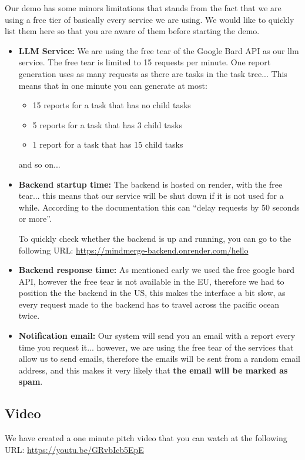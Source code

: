 \documentclass{article}
\begin{document}
Our demo has some minors limitations that stands from the fact that we are using a free tier of basically every service we are using.
We would like to quickly list them here so that you are aware of them before starting the demo.

\begin{itemize}
  \item \textbf{LLM Service:} We are using the free tear of the Google Bard API as our llm service. The free tear is limited to 15 requests per minute.
        One report generation uses as many requests as there are tasks in the task tree... This means that in one minute you can generate at most:
        \begin{itemize}
          \item 15 reports for a task that has no child tasks
          \item 5 reports for a task that has 3 child tasks
          \item 1 report for a task that has 15 child tasks
        \end{itemize}
        and so on...
  \item \textbf{Backend startup time:} The backend is hosted on render, with the free tear... this means that our service will be 
        shut down if it is not used for a while. According to the documentation this can ``delay requests by 50 seconds or more''.

        To quickly check whether the backend is up and running, you can go to the following URL: \url{https://mindmerge-backend.onrender.com/hello}
  \item \textbf{Backend response time:} As mentioned early we used the free google bard API, however the free tear is not available in the EU, therefore we
  had to position the the backend in the US, this makes the interface a bit slow, as every request made to the backend has to travel across the pacific ocean twice.

  \item \textbf{Notification email:} Our system will send you an email with a report every time you request it... however, we are using the free tear of the 
  services that allow us to send emails, therefore the emails will be sent from a random email address, and this makes it very likely that \textbf{the email will be marked as spam}.
\end{itemize}
\subsection{Video}
We have created a one minute pitch video that you can watch at the following URL: \url{https://youtu.be/GRvbIcb5EpE}
\end{document}
